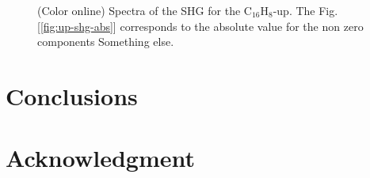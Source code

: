 \documentclass[twocolumn,aps,pra,11pt,tightenlines,showpacs,superscriptaddress,groupedaddress]{revtex4-1}
\newcommand{\upstc}{C$_{16}$H$_{8}$-up}
\begin{document}
\begin{figure}[h!]
    \caption{(Color online) Spectra of the SHG for the {\upstc}. The Fig. [\ref{fig:up-shg-abs}] corresponds to the absolute value for the non zero components {\huge Something else}.}\label{fig:shg-up}
\end{figure}






\section{Conclusions} %
\label{sec:conclusions}




\section{Acknowledgment} %
\label{sec:Acknouledgment}



\newpage

% 
\end{document}
